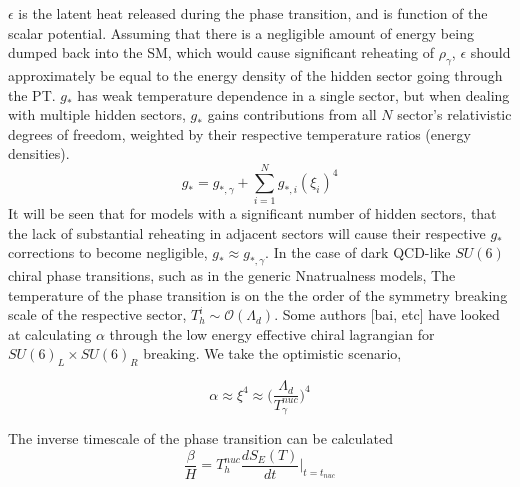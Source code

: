 \documentclass[nofootinbib,twocolumn,preprintnumbers]{revtex4-1}
\begin{document}
 $\epsilon$ is the latent heat released during the phase transition, and is function of the scalar potential. Assuming that there is a negligible amount of energy being dumped back into the SM, which would cause significant reheating of $\rho_{\gamma}$,  $\epsilon$ should approximately be equal to the energy density of the hidden sector going through the PT. $g_{*}$ has weak temperature dependence in a single sector, but when dealing with multiple hidden sectors, $g_{*}$ gains contributions from all $N$ sector's relativistic degrees of freedom, weighted by their respective temperature ratios (energy densities).
\begin{equation}
g_{*} = g_{*,\gamma} + \sum_{i = 1}^{N} g_{*,i} (\xi_{i})^4
\end{equation}
It will be seen that for models with a significant number of hidden sectors, that the lack of substantial reheating in adjacent sectors will cause their respective $g_{*}$ corrections to become negligible, $g_{*} \approx g_{*,\gamma}$. In the case of dark QCD-like $SU(6)$ chiral  phase transitions, such as in the generic Nnatrualness models, The temperature of the phase transition is on the the order of the symmetry breaking scale of the respective sector, $T_{h}^{i} \sim \mathcal{O}(\Lambda_{d})$. Some authors [bai, etc] have looked at calculating $\alpha$ through the low energy effective chiral lagrangian for $SU(6)_{L} \times SU(6)_{R}$ breaking. We take the optimistic scenario, 

\begin{equation}
\alpha \approx \xi^{4} \approx \bigg( \frac{\Lambda_{d}}{T_{\gamma}^{nuc}}\bigg)^4
\end{equation}


The inverse timescale of the phase transition can be calculated
\begin{equation}
\frac{\beta}{H} = T^{nuc}_h \frac{dS_{E}(T)}{dt}\bigg|_{t = t_{nuc}}
\end{equation}
\end{document}

